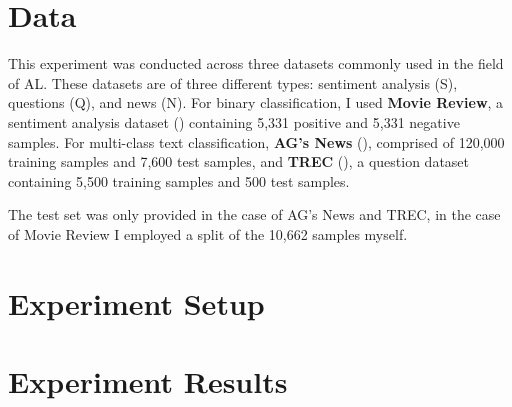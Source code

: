 \documentclass[english,bachelor,lu]{webisthesis} %
\begin{document}
\section{Data}

This experiment was conducted across three datasets commonly used in the field of AL. These datasets are of three different types: sentiment analysis (S), questions (Q), and news (N). For binary classification, I used \textbf{Movie Review}, a sentiment analysis dataset (\cite{DBLP:conf/acl/PangL05}) containing 5,331 positive and 5,331 negative samples. For multi-class text classification, \textbf{AG's News} (\cite{DBLP:conf/nips/ZhangZL15}), comprised of 120,000 training samples and 7,600 test samples, and \textbf{TREC} (\cite{DBLP:journals/nle/LiR06}), a question dataset containing 5,500 training samples and 500 test samples.

The test set was only provided in the case of AG's News and TREC, in the case of Movie Review I employed a split of the 10,662 samples myself. 


\section{Experiment Setup}


\section{Experiment Results}
\end{document}
